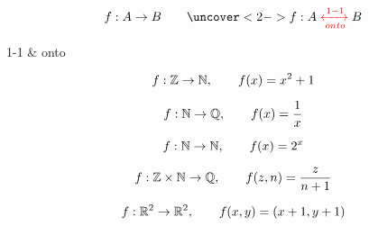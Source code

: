 \begin{frame}{}
  \begin{definition}
    \[
      f: A \to B \qquad \uncover<2->{f: A \red{\;\xleftrightarrow[onto]{1-1}\;} B}
    \]

    \begin{center}
      {1-1 \& onto}
    \end{center}
  \end{definition}
\end{frame}

\begin{frame}{}
  \[
    f: \mathbb{Z} \to \mathbb{N}, \qquad f(x) = x^2 + 1
  \]

  \pause
  \[
    f: \mathbb{N} \to \mathbb{Q}, \qquad f(x) = \frac{1}{x}
  \]

  \pause
  \[
    f: \mathbb{N} \to \mathbb{N}, \qquad f(x) = 2^{x}
  \]

  \pause
  \[
    f: \mathbb{Z} \times \mathbb{N} \to \mathbb{Q}, \qquad f(z, n) = \frac{z}{n+1}
  \]

  \pause
  \[
    f: \mathbb{R}^{2} \to \mathbb{R}^{2}, \qquad f(x,y) = (x+1, y+1)
  \]
\end{frame}



%
%
% 

